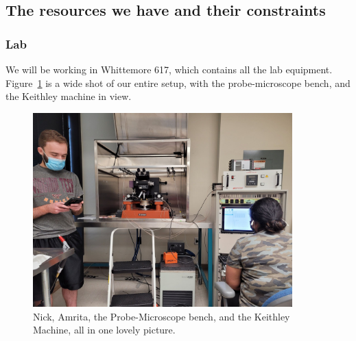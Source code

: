 \documentclass{article}
\begin{document}
        
      \newpage
      \subsection{The resources we have and their constraints} \label{resources and constraints}

        \subsubsection{Lab} \label{lab} 
        
          We will be working in Whittemore 617, which contains all the lab equipment. Figure~\ref{wholeapparatus} is a
          wide shot of our entire setup, with the probe-microscope bench, and the Keithley machine in view.

          \begin{figure}[H]
            \centering
            \includegraphics[width=10cm]{figures/apparatuswhole.jpg}
            \caption{Nick, Amrita, the Probe-Microscope bench, and the Keithley Machine, all in one lovely picture.}
            \label{wholeapparatus}
          \end{figure}
\end{document}
